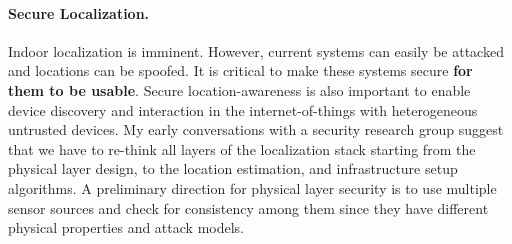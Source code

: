 \documentclass[10pt]{article}
\begin{document}
\paragraph{Secure Localization. }
Indoor localization is imminent. However, current systems can easily
be attacked and locations can be spoofed. It is critical to make these
systems secure {\bf for them to be usable}. Secure location-awareness is
also important to enable device discovery and interaction in the
internet-of-things with heterogeneous untrusted devices.
My early conversations with a security research group suggest that we have to re-think all layers of the localization stack starting from the physical layer design, to the location estimation, and infrastructure setup algorithms. %
A preliminary direction for physical layer security is to use multiple sensor sources and check for consistency among them since they have different physical properties and attack models. %

\end{document}
